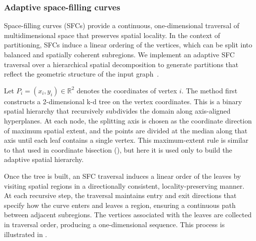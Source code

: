     
    
    \subsubsection{Adaptive space-filling curves}
    \label{sub:sfc}
    Space-filling curves (SFCs) provide a continuous, one-dimensional traversal
    of multidimensional space that preserves spatial locality.
    In the context of partitioning, SFCs induce a linear ordering of the
    vertices, 
    which can be split
    into balanced and spatially coherent subregions.
    We implement an adaptive SFC traversal over a
    hierarchical spatial decomposition to generate partitions that reflect the geometric structure of the input graph~\cite{Sasidharan15, SasidharanSnir2015SFC}.
    


    Let $P_i=(x_i, y_i)\in \mathbb{R}^2$ denotes the coordinates of vertex $i$.
    The method first constructs a 2-dimensional k-d tree on the vertex coordinates.
    This is a binary spatial hierarchy that recursively subdivides the domain along axis-aligned hyperplanes.
    At each node, the splitting axis is chosen as the coordinate direction of maximum spatial extent,
    and the points are divided at the median along that axis until each leaf contains a single vertex.
    This maximum-extent rule is similar to that used in coordinate bisection (), but here it is used only to build the adaptive spatial hierarchy.

    
    Once the tree is built, an SFC traversal induces a linear order of the leaves by visiting spatial regions in a directionally consistent, locality-preserving manner.
    At each recursive step, the traversal maintains entry and exit directions that specify how the curve enters and leaves a region, ensuring a continuous path between adjacent subregions.
    The vertices associated with the leaves are collected in traversal order, producing a one-dimensional sequence.
    This process is illustrated in .

